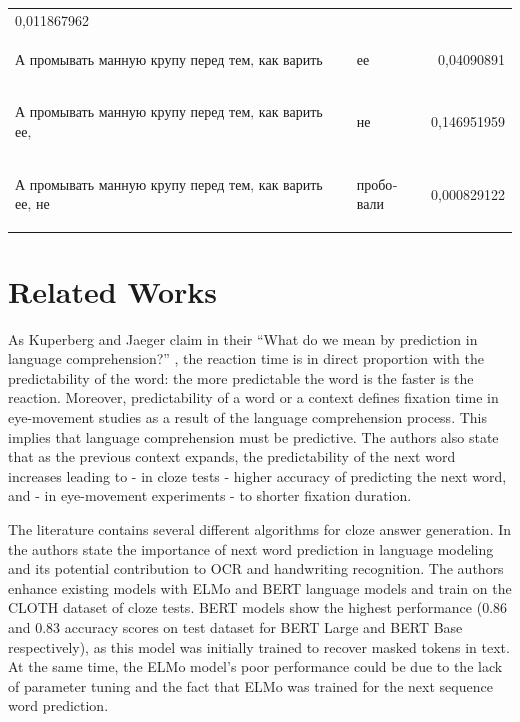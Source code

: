 \documentclass[a4paper]{article}
\begin{document}
\begin{table}
\begin{tabular}{llr}
0,011867962 \\
\begin{russian} А промывать манную крупу перед тем‚ как варить \end{russian} &
\begin{russian} ее \end{russian} &
0,04090891 \\
\begin{russian} А промывать манную крупу перед тем‚ как варить ее‚ \end{russian} &
\begin{russian} не \end{russian} &
0,146951959 \\
\begin{russian} А промывать манную крупу перед тем‚ как варить ее‚ не \end{russian} &
\begin{russian} пробовали \end{russian} &
0,000829122 \\
\end{tabular}
\end{table}

\section{Related Works}

As Kuperberg and Jaeger claim in their “What do we mean by prediction in language comprehension?” \cite{kuperberg-jaeger}, the reaction time is in direct proportion with the predictability of the word: the more predictable the word is the faster is the reaction. Moreover, predictability of a word or a context defines fixation time in eye-movement studies as a result of the language comprehension process. This implies that language comprehension must be predictive. The authors also state that as the previous context expands, the predictability of the next word increases leading to - in cloze tests - higher accuracy of predicting the next word, and - in eye-movement experiments - to shorter fixation duration.

The literature contains several different algorithms for cloze answer generation. In \cite{zhou-cloze} the authors state the importance of next word prediction in language modeling and its potential contribution to OCR and handwriting recognition. The authors enhance existing models with ELMo and BERT language models and train on the CLOTH dataset of cloze tests. BERT models show the highest performance (0.86 and 0.83 accuracy scores on test dataset for BERT Large and BERT Base respectively), as this model was initially trained to recover masked tokens in text. At the same time, the ELMo model's poor performance could be due to the lack of parameter tuning and the fact that ELMo was trained for the next sequence word prediction.
\end{document}
